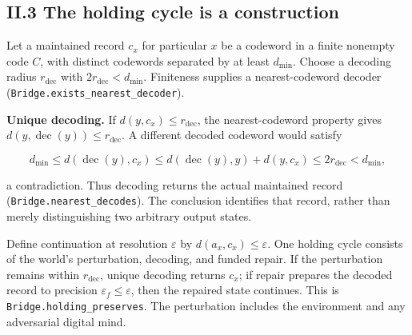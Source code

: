 \documentclass[
]{article}
\newcounter{none} %
\begin{document}
\subsection{II.3 The holding cycle is a
construction}\label{ii.3-the-holding-cycle-is-a-construction}

Let a maintained record \(c_x\) for particular \(x\) be a codeword in a
finite nonempty code \(C\), with distinct codewords separated by at
least \(d_{\min}\). Choose a decoding radius \(r_{\mathrm{dec}}\) with
\(2r_{\mathrm{dec}}<d_{\min}\). Finiteness supplies a nearest-codeword
decoder
(\texttt{B\allowbreak{}r\allowbreak{}i\allowbreak{}d\allowbreak{}g\allowbreak{}e\allowbreak{}.\allowbreak{}e\allowbreak{}x\allowbreak{}i\allowbreak{}s\allowbreak{}t\allowbreak{}s\allowbreak{}\_\allowbreak{}n\allowbreak{}e\allowbreak{}a\allowbreak{}r\allowbreak{}e\allowbreak{}s\allowbreak{}t\allowbreak{}\_\allowbreak{}d\allowbreak{}e\allowbreak{}c\allowbreak{}o\allowbreak{}d\allowbreak{}e\allowbreak{}r}).

\textbf{Unique decoding.} If \(d(y,c_x)\le r_{\mathrm{dec}}\), the
nearest-codeword property gives
\(d(y,\operatorname{dec}(y))\le r_{\mathrm{dec}}\). A different decoded
codeword would satisfy

\[
d_{\min}\le d(\operatorname{dec}(y),c_x)
\le d(\operatorname{dec}(y),y)+d(y,c_x)
\le2r_{\mathrm{dec}}<d_{\min},
\]

a contradiction. Thus decoding returns the actual maintained record
(\texttt{B\allowbreak{}r\allowbreak{}i\allowbreak{}d\allowbreak{}g\allowbreak{}e\allowbreak{}.\allowbreak{}n\allowbreak{}e\allowbreak{}a\allowbreak{}r\allowbreak{}e\allowbreak{}s\allowbreak{}t\allowbreak{}\_\allowbreak{}d\allowbreak{}e\allowbreak{}c\allowbreak{}o\allowbreak{}d\allowbreak{}e\allowbreak{}s}).
The conclusion identifies that record, rather than merely distinguishing
two arbitrary output states.

Define continuation at resolution \(\varepsilon\) by
\(d(a_x,c_x)\le\varepsilon\). One holding cycle consists of the world's
perturbation, decoding, and funded repair. If the perturbation remains
within \(r_{\mathrm{dec}}\), unique decoding returns \(c_x\); if repair
prepares the decoded record to precision
\(\varepsilon_f\le\varepsilon\), then the repaired state continues. This
is
\texttt{B\allowbreak{}r\allowbreak{}i\allowbreak{}d\allowbreak{}g\allowbreak{}e\allowbreak{}.\allowbreak{}h\allowbreak{}o\allowbreak{}l\allowbreak{}d\allowbreak{}i\allowbreak{}n\allowbreak{}g\allowbreak{}\_\allowbreak{}p\allowbreak{}r\allowbreak{}e\allowbreak{}s\allowbreak{}e\allowbreak{}r\allowbreak{}v\allowbreak{}e\allowbreak{}s}.
The perturbation includes the environment and any adversarial digital
mind.
\end{document}
